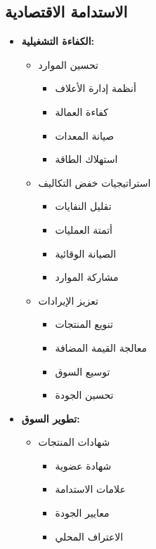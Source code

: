 \subsection{الاستدامة الاقتصادية}
\begin{itemize}
    \item \textbf{الكفاءة التشغيلية:}
    \begin{itemize}
        \item تحسين الموارد
        \begin{itemize}
            \item أنظمة إدارة الأعلاف
            \item كفاءة العمالة
            \item صيانة المعدات
            \item استهلاك الطاقة
        \end{itemize}
        
        \item استراتيجيات خفض التكاليف
        \begin{itemize}
            \item تقليل النفايات
            \item أتمتة العمليات
            \item الصيانة الوقائية
            \item مشاركة الموارد
        \end{itemize}
        
        \item تعزيز الإيرادات
        \begin{itemize}
            \item تنويع المنتجات
            \item معالجة القيمة المضافة
            \item توسيع السوق
            \item تحسين الجودة
        \end{itemize}
    \end{itemize}
    
    \item \textbf{تطوير السوق:}
    \begin{itemize}
        \item شهادات المنتجات
        \begin{itemize}
            \item شهادة عضوية
            \item علامات الاستدامة
            \item معايير الجودة
            \item الاعتراف المحلي
        \end{itemize}
        

\end{itemize}
\end{itemize}
